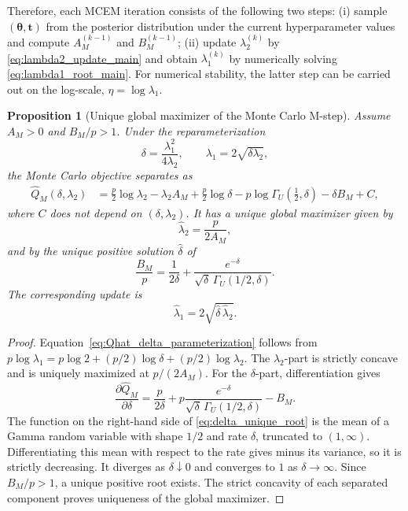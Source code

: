 \documentclass[preprint,12pt,authoryear]{elsarticle}
\newtheorem{proposition}{Proposition}
\def\bs{\boldsymbol}
\def\th{\boldsymbol{\theta}}
\begin{document}
Therefore, each MCEM iteration consists of the following two steps:
(i) sample \((\th,\bs t)\) from the posterior distribution under the current
hyperparameter values and compute \(A_M^{(k-1)}\) and \(B_M^{(k-1)}\);
(ii) update \(\lambda_2^{(k)}\) by \eqref{eq:lambda2_update_main} and obtain
\(\lambda_1^{(k)}\) by numerically solving \eqref{eq:lambda1_root_main}. For numerical
stability, the latter step can be carried out on the log-scale, \(\eta=\log\lambda_1\).


\begin{proposition}[Unique global maximizer of the Monte Carlo M-step]
\label{prop:unique-mcem-mstep}
Assume \(A_M>0\) and \(B_M/p>1\). Under the reparameterization
\[
\delta=\frac{\lambda_1^2}{4\lambda_2},
\qquad
\lambda_1=2\sqrt{\delta\lambda_2},
\]
the Monte Carlo objective separates as
\begin{align}
\widehat Q_M(\delta,\lambda_2)
&=
\frac p2\log\lambda_2-\lambda_2A_M
+\frac p2\log\delta
-p\log\Gamma_U\!\left(\frac12,\delta\right)
-\delta B_M+C,
\label{eq:Qhat_delta_parameterization}
\end{align}
where \(C\) does not depend on \((\delta,\lambda_2)\). It has a unique global
maximizer given by
\[
\widehat\lambda_2=\frac{p}{2A_M},
\]
and by the unique positive solution \(\widehat\delta\) of
\begin{equation}
\frac{B_M}{p}
=
\frac{1}{2\delta}
+
\frac{e^{-\delta}}
{\sqrt{\delta}\,\Gamma_U(1/2,\delta)}.
\label{eq:delta_unique_root}
\end{equation}
The corresponding update is
\[
\widehat\lambda_1
=2\sqrt{\widehat\delta\,\widehat\lambda_2}.
\]
\end{proposition}

\begin{proof}
Equation~\eqref{eq:Qhat_delta_parameterization} follows from
\(p\log\lambda_1=p\log 2+(p/2)\log\delta+(p/2)\log\lambda_2\).
The \(\lambda_2\)-part is strictly concave and is uniquely maximized at
\(p/(2A_M)\). For the \(\delta\)-part, differentiation gives
\[
\frac{\partial\widehat Q_M}{\partial\delta}
=
\frac{p}{2\delta}
+p\frac{e^{-\delta}}
{\sqrt{\delta}\,\Gamma_U(1/2,\delta)}
-B_M.
\]
The function on the right-hand side of
\eqref{eq:delta_unique_root} is the mean of a Gamma random variable with shape
\(1/2\) and rate \(\delta\), truncated to \((1,\infty)\). Differentiating this
mean with respect to the rate gives minus its variance, so it is strictly
decreasing. It diverges as \(\delta\downarrow0\) and converges to \(1\) as
\(\delta\to\infty\). Since \(B_M/p>1\), a unique positive root exists. The
strict concavity of each separated component proves uniqueness of the global
maximizer.
\end{proof}
\end{document}
